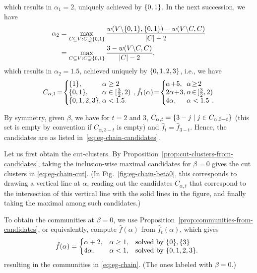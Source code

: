 which results in $\alpha_1 = 2$, uniquely achieved by $\{0,1\}$. In the next succession, we have
\begin{align*}
	\alpha_2
		&=
		\max_{C\subseteq V:C\supsetneq \{0,1\}} \frac{w(V\backslash \{0,1\},\{0,1\}) - w(V\backslash C,C)}{|C|-2} \\
		& = 
		\max_{C\subseteq V:C\supsetneq \{0,1\}} \frac{3 - w(V\backslash C,C)}{|C|-2},
\end{align*}
which results in $\alpha_2 = 1.5$, achieved uniquely by $\{0,1,2,3\}$,
i.e., we have
\begin{align*}
\arraycolsep=1pt\def\arraystretch{1.0}
	\begin{array}{lll}
	C_{\alpha,1} \! = \! \left\{
		\begin{array}{ll}
			\! \Set{1},   &   \alpha  \geq  2
			\\
			\! \Set{0,1}, &   \alpha  \in  [\frac{3}{2},2)
			\\
			\! \Set{0,1,2,3}, & \alpha  <  1.5
			.
		\end{array} 
		\right.
        &
		  ,
		  & 
		  \hat{f}_{1}(\alpha) \! = \! \left\{
		\begin{array}{ll}
			\! \alpha \!+ \! 5,  &  \alpha \! \geq  \! 2 \\
			\! 2\alpha\! + \! 3, &  \alpha \! \in \! [\frac{3}{2}, 2) \\
		   \! 4\alpha,  & \alpha < 1.5 \ .
		\end{array}
		\right.
	\end{array}
\end{align*}

By symmetry, given $\beta$, we have for $t = 2$ and $3$,
$C_{\alpha,t} = \{3-j \mid j \in C_{\alpha,3-t}\}$ (this set is empty by convention if
$C_{\alpha,3-t}$ is empty) and  $\hat{f}_{t} = \hat{f}_{3-t}$.
Hence, the candidates are as listed in~\eqref{eq:eg-chain-candidates}.


Let us first obtain the cut-clusters.
By Proposition~\ref{prop:cut-clusters-from-candidates}, taking the inclusion-wise maximal candidates
for $\beta = 0$ gives the cut clusters in \eqref{eq:eg-chain-cut}.
(In Fig.~\ref{fig:eg-chain-beta0}, this corresponds to drawing a vertical line at $\alpha$, reading
out the candidates $C_{\alpha,t}$ that correspond to the intersection of this vertical line with
the solid lines in the figure, and finally taking the maximal among such candidates.)

To obtain the communities at $\beta = 0$, we use Proposition~\ref{prop:communities-from-candidates},
or equivalently, compute $\hat{f}(\alpha)$ from $\hat{f}_{t}(\alpha)$, which gives
\begin{align*}
	\hat{f}(\alpha) = \left\{
		\begin{array}{lll}
		\!\!\!	\alpha+2, & \alpha \geq 1, & \text{solved by $\{0\}, \{3\}$}
			\\
		\!\!\!	4\alpha, & \alpha <  1, & \text{solved by $\{0,1,2,3\}$}
			.
		\end{array}
		\right.
\end{align*}
resulting in the communities in \eqref{eq:eg-chain}. (The ones labeled with $\beta = 0$.)

